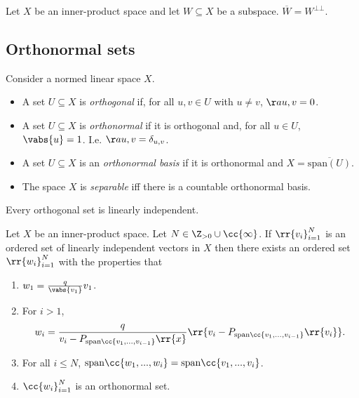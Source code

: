 \documentclass{article}
\begin{document}
\begin{theorem}
  Let $X$ be an inner-product space and let $W\subseteq X$ be a subspace. $\overline W = W^{\bot\bot}$.
\end{theorem}

\subsection{Orthonormal sets}

\begin{definition}
  Consider a normed linear space $X$.
  \begin{itemize}
    \item A set $U\subseteq X$ is \emph{orthogonal} if, for all $u,v\in U$ with
      $u\neq v$, $\aa{u,v}=0$.
    \item A set $U\subseteq X$ is \emph{orthonormal} if it is orthogonal and,
      for all $u\in U$, $\vabs{u}=1$. I.e. $\aa{u,v} = \delta_{u,v}$.
    \item A set $U\subseteq X$ is an \emph{orthonormal basis} if it is
      orthonormal and $X=\overline{\text{span}(U)}$.
    \item The space $X$ is \emph{separable} iff there is a countable orthonormal
      basis.
  \end{itemize}
\end{definition}

\begin{lemma}
  Every orthogonal set is linearly independent.
\end{lemma}

\begin{theorem}
  Let $X$ be an inner-product space. Let $N\in\Z_{>0}\cup \cc{\infty}$. If $\rr{v_i}_{i=1}^N$
  is an ordered set of linearly independent vectors in $X$ then there exists an ordered set
  $\rr{w_i}_{i=1}^N$ with the properties that
  \begin{enumerate}
    \item $w_1=\frac{q}{\vabs{v_1}}v_1$.
    \item For $i>1$, \begin{align*}
        w_i = \frac{q}{v_i-P_{\text{span}\cc{v_1,...,v_{i-1}}}\rr{x}}\rr{v_i-P_{\text{span}\cc{v_1,...,v_{i-1}}}\rr{v_i}}.
      \end{align*}
    \item For all $i\leq N$, $\text{span}\cc{w_1,...,w_i}=\text{span}\cc{v_1,...,v_i}$.
    \item $\cc{w_i}_{i=1}^N$ is an orthonormal set.
  \end{enumerate}
\end{theorem}
\end{document}
